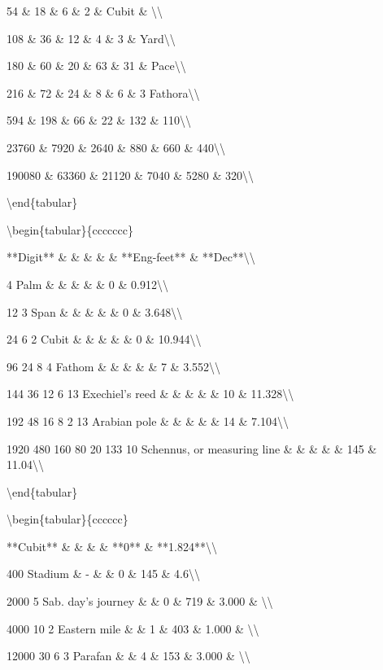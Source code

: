 \documentclass{article}
\begin{document}
54 \& 18 \& 6 \& 2 \& Cubit \& \textbackslash{}\textbackslash{}

108 \& 36 \& 12 \& 4 \& 3 \& Yard\textbackslash{}\textbackslash{}

180 \& 60 \& 20 \& 63 \& 31 \& Pace\textbackslash{}\textbackslash{}

216 \& 72 \& 24 \& 8 \& 6 \& 3 Fathora\textbackslash{}\textbackslash{}

594 \& 198 \& 66 \& 22 \& 132 \& 110\textbackslash{}\textbackslash{}

23760 \& 7920 \& 2640 \& 880 \& 660 \& 440\textbackslash{}\textbackslash{}

190080 \& 63360 \& 21120 \& 7040 \& 5280 \& 320\textbackslash{}\textbackslash{}

\textbackslash{}end\{tabular\}

\textbackslash{}begin\{tabular\}\{ccccccc\}

**Digit** \& \& \& \& \& **Eng-feet** \& **Dec**\textbackslash{}\textbackslash{}

4 Palm \& \& \& \& \& 0 \& 0.912\textbackslash{}\textbackslash{}

12 3 Span \& \& \& \& \& 0 \& 3.648\textbackslash{}\textbackslash{}

24 6 2 Cubit \& \& \& \& \& 0 \& 10.944\textbackslash{}\textbackslash{}

96 24 8 4 Fathom \& \& \& \& \& 7 \& 3.552\textbackslash{}\textbackslash{}

144 36 12 6 13 Exechiel's reed \& \& \& \& \& 10 \& 11.328\textbackslash{}\textbackslash{}

192 48 16 8 2 13 Arabian pole \& \& \& \& \& 14 \& 7.104\textbackslash{}\textbackslash{}

1920 480 160 80 20 133 10 Schennus, or measuring line \& \& \& \& \& 145 \& 11.04\textbackslash{}\textbackslash{}

\textbackslash{}end\{tabular\}

\textbackslash{}begin\{tabular\}\{cccccc\}

**Cubit** \& \& \& \& **0** \& **1.824**\textbackslash{}\textbackslash{}

400 Stadium \& - \& \& 0 \& 145 \& 4.6\textbackslash{}\textbackslash{}

2000 5 Sab. day's journey \& \& 0 \& 719 \& 3.000 \& \textbackslash{}\textbackslash{}

4000 10 2 Eastern mile \& \& 1 \& 403 \& 1.000 \& \textbackslash{}\textbackslash{}

12000 30 6 3 Parafan \& \& 4 \& 153 \& 3.000 \& \textbackslash{}\textbackslash{}
\end{document}

